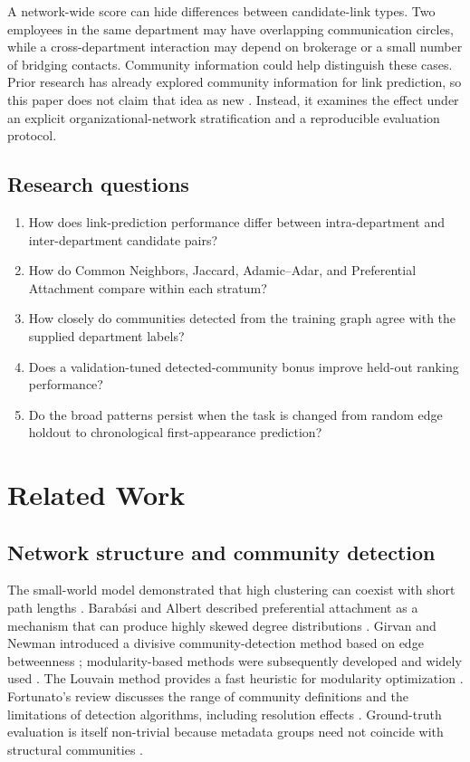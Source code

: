 \documentclass[11pt,a4paper]{article}
\begin{document}
A network-wide score can hide differences between candidate-link types. Two employees in the same department may have overlapping communication circles, while a cross-department interaction may depend on brokerage or a small number of bridging contacts. Community information could help distinguish these cases. Prior research has already explored community information for link prediction, so this paper does not claim that idea as new \citep{soundarajan2012using,kumar2024community}. Instead, it examines the effect under an explicit organizational-network stratification and a reproducible evaluation protocol.

\subsection{Research questions}
\begin{enumerate}[label=RQ\arabic*:]
\item How does link-prediction performance differ between intra-department and inter-department candidate pairs?
\item How do Common Neighbors, Jaccard, Adamic--Adar, and Preferential Attachment compare within each stratum?
\item How closely do communities detected from the training graph agree with the supplied department labels?
\item Does a validation-tuned detected-community bonus improve held-out ranking performance?
\item Do the broad patterns persist when the task is changed from random edge holdout to chronological first-appearance prediction?
\end{enumerate}

\section{Related Work}
\subsection{Network structure and community detection}
The small-world model demonstrated that high clustering can coexist with short path lengths \citep{watts1998collective}. Barabási and Albert described preferential attachment as a mechanism that can produce highly skewed degree distributions \citep{barabasi1999emergence}. Girvan and Newman introduced a divisive community-detection method based on edge betweenness \citep{girvan2002community}; modularity-based methods were subsequently developed and widely used \citep{newman2004finding,newman2006modularity}. The Louvain method provides a fast heuristic for modularity optimization \citep{blondel2008fast}. Fortunato's review discusses the range of community definitions and the limitations of detection algorithms, including resolution effects \citep{fortunato2010community}. Ground-truth evaluation is itself non-trivial because metadata groups need not coincide with structural communities \citep{yang2012groundtruth}.
\end{document}
